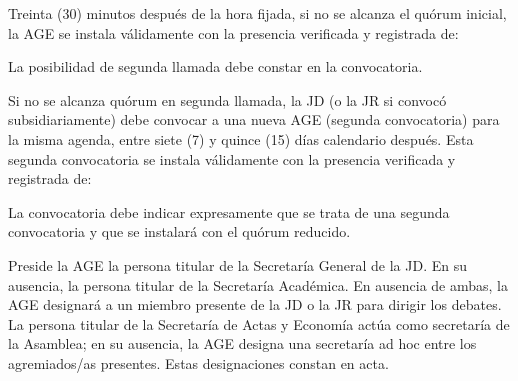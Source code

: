 \documentclass[11pt]{article}
\begin{document}
Treinta (30) minutos después de la hora fijada, si no se alcanza el quórum inicial, la AGE se instala válidamente con la presencia verificada y registrada de:
\begin{artitems}
\end{artitems}
La posibilidad de segunda llamada debe constar en la convocatoria.

Si no se alcanza quórum en segunda llamada, la JD (o la JR si convocó subsidiariamente) debe convocar a una nueva AGE (segunda convocatoria) para la misma agenda, entre siete (7) y quince (15) días calendario después. Esta segunda convocatoria se instala válidamente con la presencia verificada y registrada de:
\begin{artitems}
\end{artitems}
La convocatoria debe indicar expresamente que se trata de una segunda convocatoria y que se instalará con el quórum reducido.

Preside la AGE la persona titular de la Secretaría General de la JD.\@{} En su ausencia, la persona titular de la Secretaría Académica. En ausencia de ambas, la AGE designará a un miembro presente de la JD o la JR para dirigir los debates. La persona titular de la Secretaría de Actas y Economía actúa como secretaría de la Asamblea; en su ausencia, la AGE designa una secretaría ad hoc entre los agremiados/as presentes. Estas designaciones constan en acta.
\end{document}
